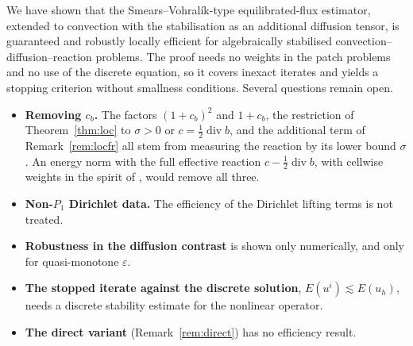 \documentclass[11pt]{article}
\newcommand{\eps}{\varepsilon}
\newcommand{\dv}{\operatorname{div}}
\theoremstyle{plain}
\theoremstyle{remark}
\numberwithin{equation}{section}
\begin{document}
We have shown that the Smears--Vohral\'ik-type equilibrated-flux estimator, extended to convection
with the stabilisation as an additional diffusion tensor, is guaranteed and robustly locally
efficient for algebraically stabilised convection--diffusion--reaction problems. The proof needs no
weights in the patch problems and no use of the discrete equation, so it covers inexact iterates and
yields a stopping criterion without smallness conditions. Several questions remain open.
\begin{itemize}
  \item \textbf{Removing $c_b$.} The factors $(1+c_b)^2$ and $1+c_b$, the restriction of
  Theorem~\ref{thm:loc} to $\sigma>0$ or $c=\frac12\dv b$, and the additional term of
  Remark~\ref{rem:locfr} all stem from measuring the reaction by its lower bound $\sigma$. An energy
  norm with the full effective reaction $c-\frac12\dv b$, with cellwise weights in the spirit of
  \cite{AV14}, would remove all three.
  \item \textbf{Non-$P_1$ Dirichlet data.} The efficiency of the Dirichlet lifting terms is not
  treated.
  \item \textbf{Robustness in the diffusion contrast} is shown only numerically, and only for
  quasi-monotone $\eps$.
  \item \textbf{The stopped iterate against the discrete solution}, $E(u^i)\lesssim E(u_h)$, needs a
  discrete stability estimate for the nonlinear operator.
  \item \textbf{The direct variant} (Remark~\ref{rem:direct}) has no efficiency result.
\end{itemize}
\end{document}
